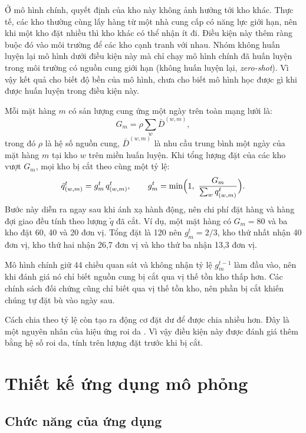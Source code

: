 Ở mô hình chính, quyết định của kho này không ảnh hưởng tới kho khác. Thực tế, các kho thường cùng lấy hàng từ một nhà cung cấp có năng lực giới hạn, nên khi một kho đặt nhiều thì kho khác có thể nhận ít đi. Điều kiện này thêm ràng buộc đó vào môi trường để các kho cạnh tranh với nhau. Nhóm không huấn luyện lại mô hình dưới điều kiện này mà chỉ chạy mô hình chính đã huấn luyện trong môi trường có nguồn cung giới hạn (không huấn luyện lại, \textit{zero-shot}). Vì vậy kết quả cho biết độ bền của mô hình, chưa cho biết mô hình học được gì khi được huấn luyện trong điều kiện này.

Mỗi mặt hàng $m$ có sản lượng cung ứng một ngày trên toàn mạng lưới là:
\begin{equation}
    G_m = \rho \sum_{w} \bar{D}^{(w,m)},
    \label{eq:nguonCung}
\end{equation}
trong đó $\rho$ là hệ số nguồn cung, $\bar{D}^{(w,m)}$ là nhu cầu trung bình một ngày của mặt hàng $m$ tại kho $w$ trên miền huấn luyện. Khi tổng lượng đặt của các kho vượt $G_m$, mọi kho bị cắt theo cùng một tỷ lệ:
\begin{equation}
    \tilde{q}_{(w,m)}^t = g_m^t \, q_{(w,m)}^t,
    \qquad
    g_m^t = \min\Bigl(1,\ \frac{G_m}{\sum_{w} q_{(w,m)}^t}\Bigr).
    \label{eq:chiaNguonCung}
\end{equation}
Bước này diễn ra ngay sau khi ánh xạ hành động, nên chi phí đặt hàng và hàng đợi giao đều tính theo lượng $\tilde{q}$ đã cắt. Ví dụ, một mặt hàng có $G_m = 80$ và ba kho đặt 60, 40 và 20 đơn vị. Tổng đặt là 120 nên $g_m^t = 2/3$, kho thứ nhất nhận 40 đơn vị, kho thứ hai nhận 26,7 đơn vị và kho thứ ba nhận 13,3 đơn vị.

Mô hình chính giữ 44 chiều quan sát và không nhận tỷ lệ $g_m^{t-1}$ làm đầu vào, nên khi đánh giá nó chỉ biết nguồn cung bị cắt qua vị thế tồn kho thấp hơn. Các chính sách đối chứng cũng chỉ biết qua vị thế tồn kho, nên phần bị cắt khiến chúng tự đặt bù vào ngày sau.

Cách chia theo tỷ lệ còn tạo ra động cơ đặt dư để được chia nhiều hơn. Đây là một nguyên nhân của hiệu ứng roi da \parencite{lee1997}. Vì vậy điều kiện này được đánh giá thêm bằng hệ số roi da, tính trên lượng đặt trước khi bị cắt.

\section{Thiết kế ứng dụng mô phỏng}
\label{sec:ungDung}

\subsection{Chức năng của ứng dụng}
\label{subsec:chucNangUngDung}

